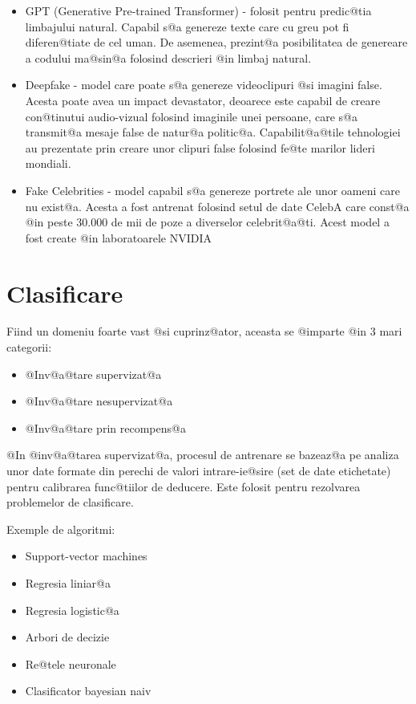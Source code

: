 \begin{itemize}
	\item GPT (Generative Pre-trained Transformer) - folosit pentru predic@tia limbajului natural. Capabil s@a genereze texte care cu greu pot fi diferen@tiate de cel uman. De asemenea, prezint@a posibilitatea de genereare a codului ma@sin@a folosind descrieri @in limbaj natural.
	\item Deepfake - model care poate s@a genereze videoclipuri @si imagini false. Acesta poate avea un impact devastator, deoarece este capabil de creare con@tinutui audio-vizual folosind imaginile unei persoane, care s@a transmit@a mesaje false de natur@a politic@a. Capabilit@a@tile tehnologiei au prezentate prin creare unor clipuri false folosind fe@te marilor lideri mondiali.
	\item Fake Celebrities - model capabil s@a genereze portrete ale unor oameni care nu exist@a. Acesta a fost antrenat folosind setul de date CelebA care const@a @in peste 30.000 de mii de poze a diverselor celebrit@a@ti. Acest model a fost create @in laboratoarele NVIDIA 
	\cite{nvidia-gan}  
\end{itemize}
 
\newpage

\section{Clasificare}

Fiind un domeniu foarte vast @si cuprinz@ator, aceasta se @imparte @in 3 mari categorii:
\hspace{0.2cm}\begin{itemize}
	\item @Inv@a@tare supervizat@a
	\item @Inv@a@tare nesupervizat@a
	\item @Inv@a@tare prin recompens@a
\end{itemize}

\vspace{0.3cm}
@In @inv@a@tarea supervizat@a, procesul de antrenare se bazeaz@a pe analiza unor date formate din perechi de valori intrare-ie@sire (set de date etichetate) pentru calibrarea func@tiilor de deducere. Este folosit pentru rezolvarea problemelor de clasificare.

Exemple de algoritmi:
\begin{itemize}
	\item Support-vector machines
	\item Regresia liniar@a
	\item Regresia logistic@a
	\item Arbori de decizie
	\item Re@tele neuronale
	\item Clasificator bayesian naiv
\end{itemize}


